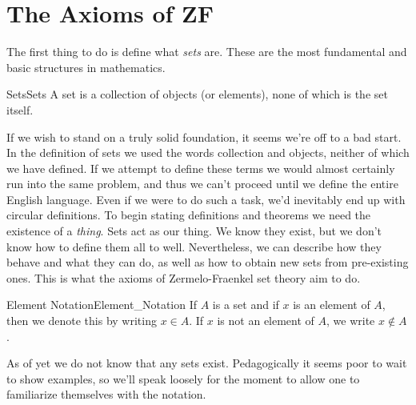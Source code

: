 \section{The Axioms of ZF}
    The first thing to do is define what \textit{sets} are. These are the
    most fundamental and basic structures in mathematics.
    \begin{fdefinition}{Sets}{Sets}
        A set is a collection of objects (or elements),
        none of which is the set itself.
    \end{fdefinition}
    If we wish to stand on a truly solid foundation, it seems we're off to a
    bad start. In the definition of sets we used the words \textrm{collection}
    and \textrm{objects}, neither of which we have defined. If we attempt to
    define these terms we would almost certainly run into the same problem,
    and thus we can't proceed until we define the entire English language.
    Even if we were to do such a task, we'd inevitably end up with circular
    definitions. To begin stating definitions and theorems we need the
    existence of a \textit{thing}. Sets act as our thing. We know they exist,
    but we don't know how to define them all to well. Nevertheless, we can
    describe how they behave and what they can do, as well as how to obtain
    new sets from pre-existing ones. This is what the axioms of
    Zermelo-Fraenkel set theory aim to do.
    \begin{fnotation}{Element Notation}{Element_Notation}
        If $A$ is a set and if $x$ is an element of $A$, then we denote this
        by writing $x\in{A}$. If $x$ is not an element of $A$, we write
        $x\notin{A}$.
    \end{fnotation}
    As of yet we do not know that any sets exist. Pedagogically it seems poor
    to wait to show examples, so we'll speak loosely for the moment to allow
    one to familiarize themselves with the notation.

